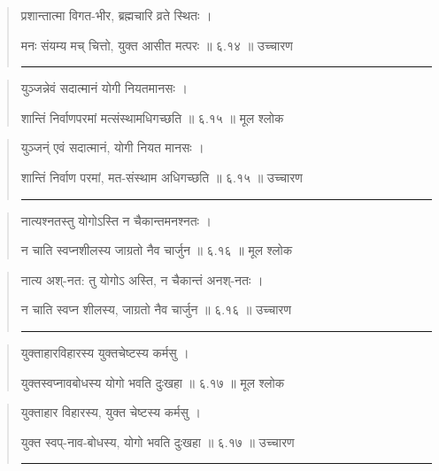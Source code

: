 \begin{quotation}

प्रशान्तात्मा विगत-भीर, ब्रह्मचारि व्रते स्थितः  ।  

मनः संयम्य मच् चित्तो, युक्त आसीत मत्परः  ॥ ६.१४ ॥  उच्चारण

\noindent\rule{16cm}{0.4pt} 
\end{quotation}


\begin{quotation}  

युञ्जन्नेवं सदात्मानं योगी नियतमानसः  ।  

शान्तिं निर्वाणपरमां मत्संस्थामधिगच्छति  ॥ ६.१५ ॥  मूल श्लोक
\end{quotation}

\begin{quotation}

युञ्जन्ं एवं सदात्मानं, योगी नियत मानसः  ।  

शान्तिं निर्वाण परमां, मत-संस्थाम अधिगच्छति  ॥ ६.१५ ॥  उच्चारण

\noindent\rule{16cm}{0.4pt} 
\end{quotation}


\begin{quotation}  

नात्यश्नतस्तु योगोऽस्ति न चैकान्तमनश्नतः  ।  

न चाति स्वप्नशीलस्य जाग्रतो नैव चार्जुन  ॥ ६.१६ ॥  मूल श्लोक
\end{quotation}

\begin{quotation}

नात्य अश्-नत: तु योगोऽ अस्ति, न चैकान्तं अनश्-नतः  ।  

न चाति स्वप्न शीलस्य, जाग्रतो नैव चार्जुन  ॥ ६.१६ ॥  उच्चारण

\noindent\rule{16cm}{0.4pt} 
\end{quotation}


\begin{quotation}  

युक्ताहारविहारस्य युक्तचेष्टस्य कर्मसु  ।  

युक्तस्वप्नावबोधस्य योगो भवति दुःखहा  ॥ ६.१७ ॥  मूल श्लोक
\end{quotation}

\begin{quotation}

युक्ताहार विहारस्य, युक्त चेष्टस्य कर्मसु  ।  

युक्त स्वप्-नाव-बोधस्य, योगो भवति दुःखहा  ॥ ६.१७ ॥  उच्चारण

\noindent\rule{16cm}{0.4pt} 
\end{quotation}


